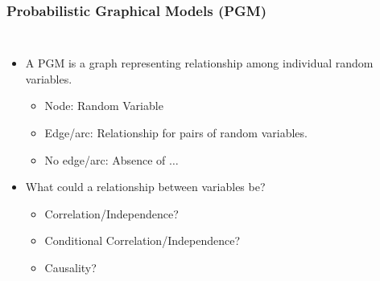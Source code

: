 \begin{frame}
    \frametitle{Probabilistic Graphical Models (PGM)}
    \begin{columns}[t]
\begin{itemize}
\item A PGM is a graph representing relationship among individual random variables.
\begin{itemize}
    \item Node: Random Variable
    \item Edge/arc: Relationship for pairs of random variables.
    \item No edge/arc: Absence of $\ldots$
\end{itemize}
\pause
\item What could a relationship between variables be?
\begin{itemize}
\pause \item Correlation/Independence?
\pause \item Conditional Correlation/Independence?
\pause \item Causality?
\end{itemize}
\end{itemize}

\pause


\end{columns}
\end{frame}
